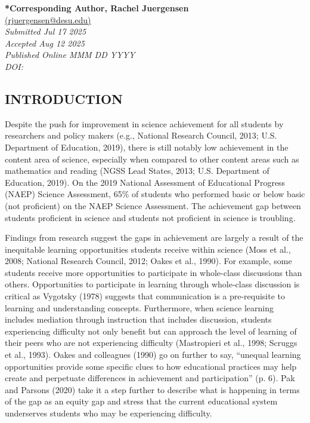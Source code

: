 \documentclass{sig-alternate} %
\begin{document}
\textbf{*Corresponding Author, Rachel Juergensen}\\ %
\href{mailto:rjuergensen@desu.edu}{(rjuergensen@desu.edu)} \\ %
\textit{Submitted Jul 17 2025} \\ %
\textit{Accepted Aug 12 2025} \\ %
\textit{Published Online MMM DD YYYY} \\ %
\textit{DOI: } \\ %
\pagebreak 
\clearpage %
\begin{large}

\section*{INTRODUCTION}

Despite the push for improvement in science achievement for all students by researchers and policy makers (e.g., National Research Council, 2013; U.S. Department of Education, 2019), there is still notably low achievement in the content area of science, especially when compared to other content areas such as mathematics and reading (NGSS Lead States, 2013; U.S. Department of Education, 2019). On the 2019 National Assessment of Educational Progress (NAEP) Science Assessment, 65\% of students who performed basic or below basic (not proficient) on the NAEP Science Assessment. The achievement gap between students proficient in science and students not proficient in science is troubling. 

Findings from research suggest the gaps in achievement are largely a result of the inequitable learning opportunities students receive within science (Moss et al., 2008; National Research Council, 2012; Oakes et al., 1990). For example, some students receive more opportunities to participate in whole-class discussions than others. Opportunities to participate in learning through whole-class discussion is critical as Vygotsky (1978) suggests that communication is a pre-requisite to learning and understanding concepts. Furthermore, when science learning includes mediation through instruction that includes discussion, students experiencing difficulty not only benefit but can approach the level of learning of their peers who are not experiencing difficulty (Mastropieri et al., 1998; Scruggs et al., 1993). Oakes and colleagues (1990) go on further to say, “unequal learning opportunities provide some specific clues to how educational practices may help create and perpetuate differences in achievement and participation” (p. 6). Pak and Parsons (2020) take it a step further to describe what is happening in terms of the gap as an equity gap and stress that the current educational system underserves students who may be experiencing difficulty. 


\end{large}
\end{document}
